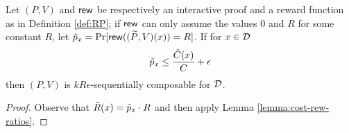 \begin{mycorollary}
\label{cor:prob}
Let $(P,V)$ and $\mathsf{rew}$ be respectively an interactive proof and a reward 
function as in 
Definition \ref{def:RP}; if $\mathsf{rew}$ can only assume the values $0$ and $R$ for 
some constant $R$, let $\tilde{p}_x = \Pr[\mathsf{rew}((\widetilde{P},V)(x)) = R]$. If for $x \in {\cal D}$
$$  \tilde{p}_x \leq \frac{\tilde{C}(x)}{C} + \epsilon $$
then $(P,V)$ is $kR\epsilon$-sequentially composable for $\cal D$. 
\end{mycorollary}
\begin{proof}
Observe that $\tilde{R}(x) = \tilde{p}_x\cdot R$ and then apply Lemma 
\ref{lemma:cost-rew-ratios}.
\end{proof}


